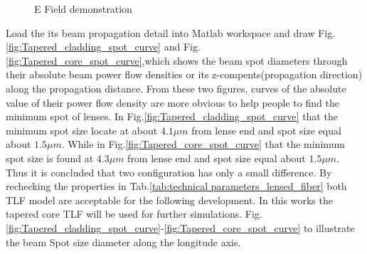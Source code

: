 \begin{figure}[!ht]
	\centering
\end{figure}
\begin{figure}[!ht]
	\centering
	\caption{E Field demonstration}
\end{figure}
Load the its beam propagation detail into Matlab workspace and draw
Fig.\ref{fig:Tapered_cladding_spot_curve} and Fig.\ref{fig:Tapered_core_spot_curve},which shows the beam spot diameters through their absolute beam power flow densities or its z-compents(propagation direction) along the propagation distance. From these two figures, curves of the absolute value of their power flow density are more obvious to help people to find the minimum spot of lenses. In Fig.\ref{fig:Tapered_cladding_spot_curve} that the minimum spot size locate at about $4.1 \mu m$ from lense end and spot size equal about $1.5 \mu m$. While in Fig.\ref{fig:Tapered_core_spot_curve} that the minimum spot size is found at  $4.3 \mu m$ from lense end and spot size equal about $1.5 \mu m$. Thus it is concluded that two configuration has only a small difference. By rechecking the properties in Tab.\ref{tab:technical parameters_lensed_fiber} both TLF model are acceptable for the following development. In this works the tapered core TLF will be used for further simulations.
Fig.\ref{fig:Tapered_cladding_spot_curve}-\ref{fig:Tapered_core_spot_curve} to illustrate the beam Spot size diameter along the longitude axis.
